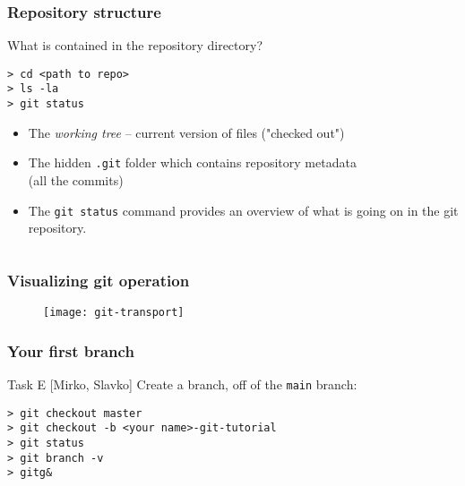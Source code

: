 
\begin{frame}[fragile]

\frametitle{Repository structure}

What is contained in the repository directory?
	
\begin{verbatim}
> cd <path to repo>
> ls -la
> git status
\end{verbatim}
	
\begin{itemize}
	\item The \textit{working tree} -- current version of files ("checked out")
	\item The hidden \texttt{.git} folder which contains repository metadata \\ (all the commits)
	\item The \texttt{git status} command provides an overview of what is going on in the git repository.
\end{itemize}
\begin{verbatim}
\end{verbatim}
	
\end{frame}


\begin{frame}
	\frametitle{Visualizing git operation}
	
	\begin{figure}
		\texttt{[image: git-transport]}
	\end{figure}
\end{frame}



\begin{frame}[fragile]
	\frametitle{Your first branch}
	
	\begin{block}{Task E [Mirko, Slavko]}
	Create a branch, off of the \texttt{main} branch:

	\begin{verbatim}
> git checkout master
> git checkout -b <your name>-git-tutorial
> git status
> git branch -v
> gitg&
	\end{verbatim}
	
	\end{block}
	
\end{frame}


